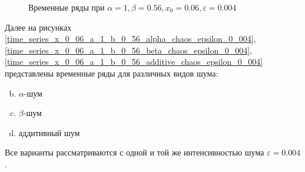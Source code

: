 \begin{figure}
        
        \captionsetup{justification=centering}
        \caption{Временные ряды при \(\alpha = 1, \beta = 0.56, x_0 = 0.06, \varepsilon = 0.004\)}
    \end{figure}

    Далее на рисунках \ref{time_series_x_0_06_a_1_b_0_56_alpha_chaos_epsilon_0_004}, \ref{time_series_x_0_06_a_1_b_0_56_beta_chaos_epsilon_0_004}, \ref{time_series_x_0_06_a_1_b_0_56_additive_chaos_epsilon_0_004} представлены временные ряды для различных видов шума: 

    \begin{enumerate}[a)]
        \setcounter{enumi}{1}
        \item \(\alpha\)-шум
        \item \(\beta\)-шум
        \item аддитивный шум
    \end{enumerate}

    Все варианты рассматриваются с одной и той же интенсивностью шума \(\varepsilon = 0.004\). 
        
